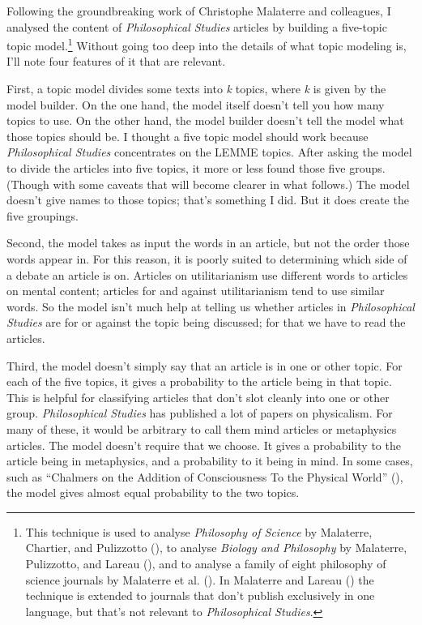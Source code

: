 \documentclass[
  10pt,
  letterpaper,
  DIV=11,
  numbers=noendperiod,
  twoside]{scrartcl}
\begin{document}
Following the groundbreaking work of Christophe Malaterre and
colleagues, I analysed the content of \emph{Philosophical Studies}
articles by building a five-topic topic model.\footnote{This technique
  is used to analyse \emph{Philosophy of Science} by Malaterre,
  Chartier, and Pulizzotto (), to
  analyse \emph{Biology and Philosophy} by Malaterre, Pulizzotto, and
  Lareau (), and to analyse a family
  of eight philosophy of science journals by Malaterre et al.
  (). In Malaterre and Lareau
  () the technique is extended to
  journals that don't publish exclusively in one language, but that's
  not relevant to \emph{Philosophical Studies}.} Without going too deep
into the details of what topic modeling is, I'll note four features of
it that are relevant.

First, a topic model divides some texts into \emph{k} topics, where
\emph{k} is given by the model builder. On the one hand, the model
itself doesn't tell you how many topics to use. On the other hand, the
model builder doesn't tell the model what those topics should be. I
thought a five topic model should work because \emph{Philosophical
Studies} concentrates on the LEMME topics. After asking the model to
divide the articles into five topics, it more or less found those five
groups. (Though with some caveats that will become clearer in what
follows.) The model doesn't give names to those topics; that's something
I did. But it does create the five groupings.

Second, the model takes as input the words in an article, but not the
order those words appear in. For this reason, it is poorly suited to
determining which side of a debate an article is on. Articles on
utilitarianism use different words to articles on mental content;
articles for and against utilitarianism tend to use similar words. So
the model isn't much help at telling us whether articles in
\emph{Philosophical Studies} are for or against the topic being
discussed; for that we have to read the articles.

Third, the model doesn't simply say that an article is in one or other
topic. For each of the five topics, it gives a probability to the
article being in that topic. This is helpful for classifying articles
that don't slot cleanly into one or other group. \emph{Philosophical
Studies} has published a lot of papers on physicalism. For many of
these, it would be arbitrary to call them mind articles or metaphysics
articles. The model doesn't require that we choose. It gives a
probability to the article being in metaphysics, and a probability to it
being in mind. In some cases, such as ``Chalmers on the Addition of
Consciousness To the Physical World''
(), the model gives almost
equal probability to the two topics.
\end{document}
